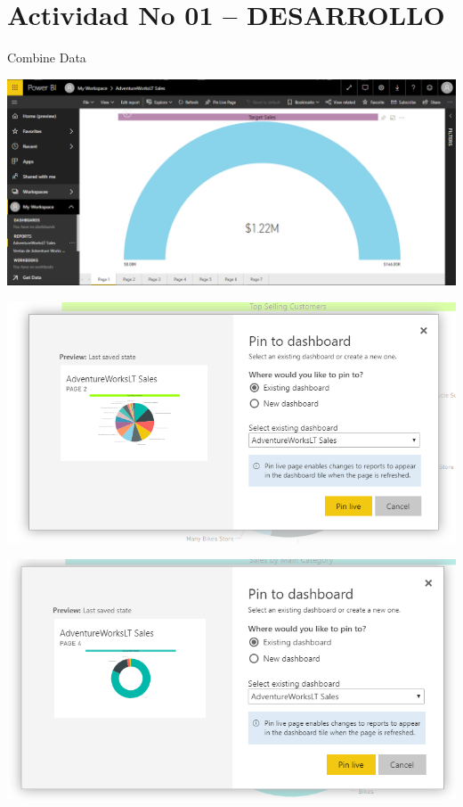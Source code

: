 \section{Actividad No 01 – DESARROLLO} 

         Combine Data \\

	\begin{center}
	\includegraphics[width=15cm]{./Imagenes/31.png}
	\end{center}	
\begin{center}
	\includegraphics[width=15cm]{./Imagenes/32.png}
	\end{center}	

	
\begin{center}
	\includegraphics[width=15cm]{./Imagenes/33.png}
	\end{center}	

	

	